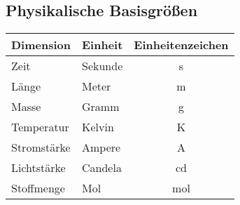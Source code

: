\documentclass
[
  fontsize = 11pt,
  parskip  = half-,
  BCOR     = 0pt,
  DIV      = 11,
  draft,
  ngerman,
  dvipsnames
]
{scrartcl}
\begin{document}
\subsection*{Physikalische Basisgrößen}
\begin{center}
  \begingroup
    \renewcommand{\arraystretch}{1.1}%
    \begin{tabular}{|l|l|c|}
      \hline
      \textbf{Dimension}        &
      \textbf{Einheit}          &
      \textbf{Einheitenzeichen} \\
      \hline
      Zeit        & Sekunde & s   \\
      \hline
      Länge       & Meter   & m   \\
      \hline
      Masse       & Gramm   & g   \\
      \hline
      Temperatur  & Kelvin  & K   \\
      \hline
      Stromstärke & Ampere  & A   \\
      \hline
      Lichtstärke & Candela & cd  \\
      \hline
      Stoffmenge  & Mol     & mol \\
      \hline
    \end{tabular}
  \endgroup
\end{center}

\end{document}
